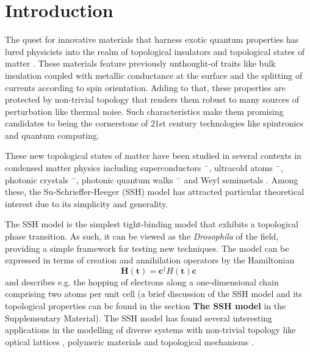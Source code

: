 \documentclass[10pt]{revtex4-1}
\begin{document}
\maketitle


\section{Introduction}
\label{introduction}
The quest for innovative materials that harness exotic quantum properties has lured physicists into the realm of topological insulators and topological states of matter \cite{RevModPhys.82.3045}. These materials feature previously unthought-of traits like bulk insulation coupled with metallic conductance at the surface and the splitting of currents according to spin orientation. Adding to that, these properties are protected by non-trivial topology that renders them robust to many sources of perturbation like thermal noise. Such characteristics make them promising candidates to being the cornerstone of 21st century technologies like spintronics and quantum computing.

These new topological states of matter have been studied in several contexts in condensed matter physics including superconductors \cite {CONTINENTINO2017A1}$^-$\cite{ryu2010topological}, ultracold atoms \cite{atala2013direct}$^-$\cite{meier2016observation}, photonic crystals \cite{hafezi2013imaging}$^-$\cite{PhysRevX.5.031011}, photonic quantum walks \cite{kitagawa2012observation}$^-$\cite{PhysRevX.7.031023} and Weyl semimetals \cite{soluyanov2015type,PhysRevX.5.031013}. Among these, the Su-Schrieffer-Heeger (SSH) model \cite{PhysRevLett.42.1698} has attracted particular theoretical interest due to its simplicity and generality.

The SSH model is the simplest tight-binding model that exhibits a topological phase transition. As such, it can be viewed as the \emph{Drosophila} of the field, providing a simple framework for testing new techniques. The model can be expressed in terms of creation and annihilation operators by the Hamiltonian
\begin{equation}
\label{SSH_ham}
\mathbf{H}(\mathbf{t})=\mathbf{c}^{\dagger}H(\mathbf{t})\mathbf{c}
\end{equation}
and describes e.g. the hopping of electrons along a one-dimensional chain comprising two atoms per unit cell (a brief discussion of the SSH model and its topological properties can be found in the section \textbf{The SSH model} in the Supplementary Material). The SSH model has found several interesting applications in the modelling of diverse systems with non-trivial topology like optical lattices \cite{maffei2018topological}, polymeric materials \cite{RevModPhys.73.681} and topological mechanisms \cite{kane2014topological,Chen13004}.
\end{document}
